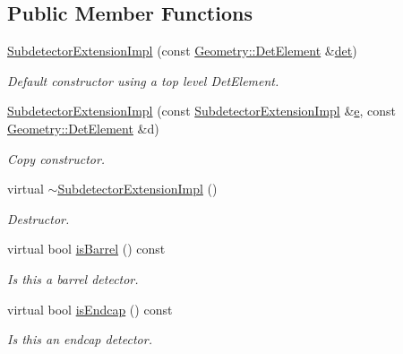 \subsection*{Public Member Functions}
\begin{DoxyCompactItemize}
\item 
\hyperlink{class_d_d4hep_1_1_d_d_rec_1_1_subdetector_extension_impl_aa87c1c247120d64f47319b314c1e9981}{Subdetector\+Extension\+Impl} (const \hyperlink{class_d_d4hep_1_1_geometry_1_1_det_element}{Geometry\+::\+Det\+Element} \&\hyperlink{class_d_d4hep_1_1_d_d_rec_1_1_subdetector_extension_impl_a5573895361adac8070eb23454538d76e}{det})
\begin{DoxyCompactList}\small\item\em Default constructor using a top level Det\+Element. \end{DoxyCompactList}\item 
\hyperlink{class_d_d4hep_1_1_d_d_rec_1_1_subdetector_extension_impl_a9443068ab7f0f9c8da31798bac46fab7}{Subdetector\+Extension\+Impl} (const \hyperlink{class_d_d4hep_1_1_d_d_rec_1_1_subdetector_extension_impl}{Subdetector\+Extension\+Impl} \&\hyperlink{_volumes_8cpp_a8a9a1f93e9b09afccaec215310e64142}{e}, const \hyperlink{class_d_d4hep_1_1_geometry_1_1_det_element}{Geometry\+::\+Det\+Element} \&d)
\begin{DoxyCompactList}\small\item\em Copy constructor. \end{DoxyCompactList}\item 
virtual \hyperlink{class_d_d4hep_1_1_d_d_rec_1_1_subdetector_extension_impl_afd3a7134db3e0d40b6fc9cdbb809f147}{$\sim$\+Subdetector\+Extension\+Impl} ()
\begin{DoxyCompactList}\small\item\em Destructor. \end{DoxyCompactList}\item 
virtual bool \hyperlink{class_d_d4hep_1_1_d_d_rec_1_1_subdetector_extension_impl_a1e89ba5b16e3697f85612cc7651cd56b}{is\+Barrel} () const
\begin{DoxyCompactList}\small\item\em Is this a barrel detector. \end{DoxyCompactList}\item 
virtual bool \hyperlink{class_d_d4hep_1_1_d_d_rec_1_1_subdetector_extension_impl_a2381b0fbcdaaedff410cff6a56c74d45}{is\+Endcap} () const
\begin{DoxyCompactList}\small\item\em Is this an endcap detector. \end{DoxyCompactList}\item 

\end{DoxyCompactItemize}
